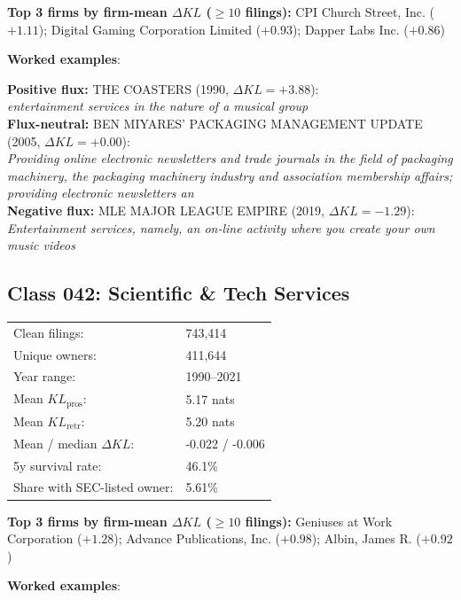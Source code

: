 \textbf{Top 3 firms by firm-mean $\Delta KL$ ($\geq 10$ filings):} CPI Church Street, Inc. ($+1.11$); Digital Gaming Corporation Limited ($+0.93$); Dapper Labs Inc. ($+0.86$)

\textbf{Worked examples}:

  \textbf{Positive flux:} \textsc{THE COASTERS} (1990, $\Delta KL=+3.88$):\\
  \textit{entertainment services in the nature of a musical group}\\
  \textbf{Flux-neutral:} \textsc{BEN MIYARES' PACKAGING MANAGEMENT UPDATE} (2005, $\Delta KL=+0.00$):\\
  \textit{Providing online electronic newsletters and trade journals in the field of packaging machinery, the packaging machinery industry and association membership affairs; providing electronic newsletters an}\\
  \textbf{Negative flux:} \textsc{MLE MAJOR LEAGUE EMPIRE} (2019, $\Delta KL=-1.29$):\\
  \textit{Entertainment services, namely, an on-line activity where you create your own music videos}\\

\subsection*{Class 042: Scientific \& Tech Services}
\label{app:industry-042}

\begin{tabular}{ll}
Clean filings: & 743,414 \\
Unique owners: & 411,644 \\
Year range: & 1990--2021 \\
Mean $KL_\text{pros}$: & 5.17 nats \\
Mean $KL_\text{retr}$: & 5.20 nats \\
Mean / median $\Delta KL$: & -0.022 / -0.006 \\
5y survival rate: & 46.1\% \\
Share with SEC-listed owner: & 5.61\% \\
\end{tabular}

\textbf{Top 3 firms by firm-mean $\Delta KL$ ($\geq 10$ filings):} Geniuses at Work Corporation ($+1.28$); Advance Publications, Inc. ($+0.98$); Albin, James R. ($+0.92$)

\textbf{Worked examples}:

